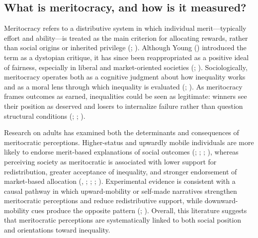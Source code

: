 \documentclass[
  13pt,
]{article}
\begin{document}
\subsection{What is meritocracy, and how is it
measured?}\label{what-is-meritocracy-and-how-is-it-measured}

Meritocracy refers to a distributive system in which individual
merit---typically effort and ability---is treated as the main criterion
for allocating rewards, rather than social origins or inherited
privilege (;
). Although Young
() introduced the term as a
dystopian critique, it has since been reappropriated as a positive ideal
of fairness, especially in liberal and market-oriented societies
(;
).
Sociologically, meritocracy operates both as a cognitive judgment about
how inequality works and as a moral lens through which inequality is
evaluated (; ). As
meritocracy frames outcomes as earned, inequalities could be seen as
legitimate: winners see their position as deserved and losers to
internalize failure rather than question structural conditions
(;
;
).

Research on adults has examined both the determinants and consequences
of meritocratic perceptions. Higher-status and upwardly mobile
individuals are more likely to endorse merit-based explanations of
social outcomes (;
; ;
), whereas
perceiving society as meritocratic is associated with lower support for
redistribution, greater acceptance of inequality, and stronger
endorsement of market-based allocation
(,
;
;
; ). Experimental evidence is consistent with a causal
pathway in which upward-mobility or self-made narratives strengthen
meritocratic perceptions and reduce redistributive support, while
downward-mobility cues produce the opposite pattern
(;
).
Overall, this literature suggests that meritocratic perceptions are
systematically linked to both social position and orientations toward
inequality.
\end{document}
